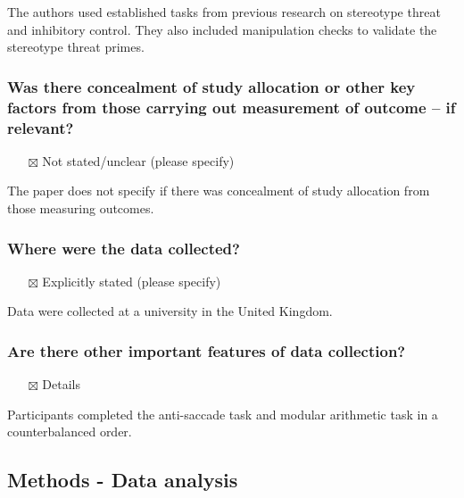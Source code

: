 \documentclass[
  doc, a4paper]{apa7}
\providecommand{\tightlist}{%
  \setlength{\itemsep}{0pt}\setlength{\parskip}{0pt}}
\begin{document}
The authors used established tasks from previous research on stereotype threat and inhibitory control. They also included manipulation checks to validate the stereotype threat primes.

\subsubsection{Was there concealment of study allocation or other key factors from those carrying out measurement of outcome -- if relevant?}\label{was-there-concealment-of-study-allocation-or-other-key-factors-from-those-carrying-out-measurement-of-outcome-if-relevant}

\begin{itemize}
\tightlist
\item[$\boxtimes$]
  Not stated/unclear (please specify)
\end{itemize}

The paper does not specify if there was concealment of study allocation from those measuring outcomes.

\subsubsection{Where were the data collected?}\label{where-were-the-data-collected}

\begin{itemize}
\tightlist
\item[$\boxtimes$]
  Explicitly stated (please specify)
\end{itemize}

Data were collected at a university in the United Kingdom.

\subsubsection{Are there other important features of data collection?}\label{are-there-other-important-features-of-data-collection}

\begin{itemize}
\tightlist
\item[$\boxtimes$]
  Details
\end{itemize}

Participants completed the anti-saccade task and modular arithmetic task in a counterbalanced order.

\subsection{Methods - Data analysis}\label{methods---data-analysis}
\end{document}
